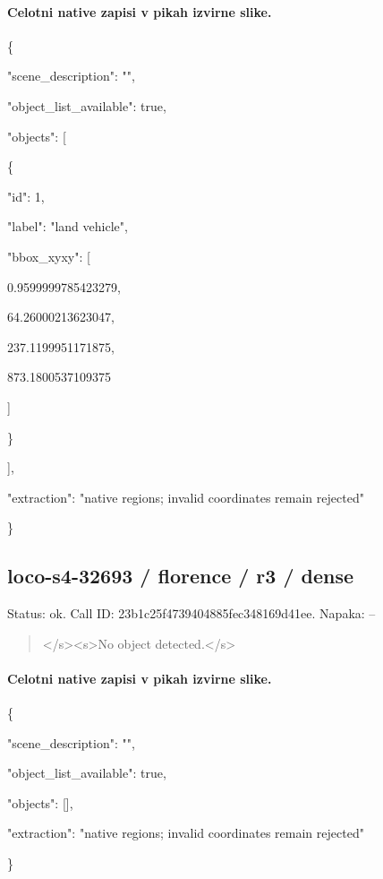 \documentclass[10pt,a4paper]{article}
\begin{document}
\paragraph{Celotni native zapisi v pikah izvirne slike.}
\{\par
  "scene\_description":\allowbreak{} "",\allowbreak{}\par
  "object\_list\_available":\allowbreak{} true,\allowbreak{}\par
  "objects":\allowbreak{} [\par
    \{\par
      "id":\allowbreak{} 1,\allowbreak{}\par
      "label":\allowbreak{} "land vehicle",\allowbreak{}\par
      "bbox\_xyxy":\allowbreak{} [\par
        0.9599999785423279,\allowbreak{}\par
        64.26000213623047,\allowbreak{}\par
        237.1199951171875,\allowbreak{}\par
        873.1800537109375\par
      ]\par
    \}\par
  ],\allowbreak{}\par
  "extraction":\allowbreak{} "native regions; invalid coordinates remain rejected"\par
\}
\subsection*{loco-s4-32693 / florence / r3 / dense}
Status: ok. Call ID: 23b1c25f4739404885fec348169d41ee. Napaka: --
\begin{quote}\footnotesize
</s>\allowbreak{}<s>\allowbreak{}No object detected.</s>\allowbreak{}
\end{quote}
\paragraph{Celotni native zapisi v pikah izvirne slike.}
\{\par
  "scene\_description":\allowbreak{} "",\allowbreak{}\par
  "object\_list\_available":\allowbreak{} true,\allowbreak{}\par
  "objects":\allowbreak{} [],\allowbreak{}\par
  "extraction":\allowbreak{} "native regions; invalid coordinates remain rejected"\par
\}
\end{document}
